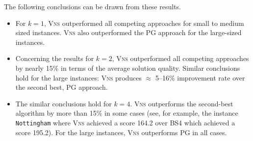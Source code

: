 \documentclass[dvipsnames,format=sigconf]{acmart} %
\begin{document}
The following conclusions can be drawn from these results. 
\begin{itemize}
  		\item  For $k=1$, \textsc{Vns} outperformed all competing approaches for small to medium sized instances. \textsc{Vns} also outperformed the PG approach for the large-sized instances. 
  		\item Concerning the results for $k=2$, \textsc{Vns} outperformed all competing approaches by nearly 15\% in terms of the average solution quality. Similar conclusions hold for the large instances: \textsc{Vns} produces $\approx$ 5--16\% improvement rate over the second best, PG approach. 
  		\item The similar {\color{red}conclusions hold} for $k=4$. \textsc{Vns} outperforms the second-best algorithm by more than 15\% in some cases (see, for example,  the instance \texttt{Nottingham} where \textsc{Vns} achieved a score 164.2 over BS4 which achieved a score 195.2). For the large instances, \textsc{Vns}   outperforms PG in all cases. 
\end{itemize}

 
 
\end{document}
